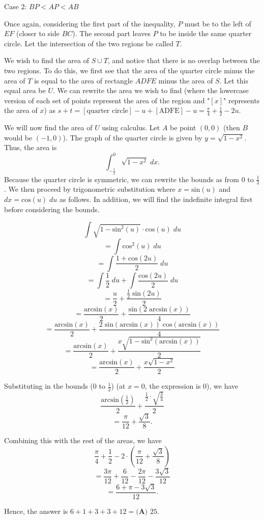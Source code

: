 \begin{enumerate}
 Case $2$: $BP<AP<AB$

 Once again, considering the first part of the inequality, $P$ must be to the left of $EF$ (closer to side $BC$). The second part leaves $P$ to be inside the same quarter circle. Let the intersection of the two regions be called $T$.

 We wish to find the area of $S \cup T$, and notice that there is no overlap between the two regions. To do this, we first see that the area of the quarter circle minus the area of $T$ is equal to the area of rectangle $ADFE$ minus the area of $S$. Let this equal area be $U$. We can rewrite the area we wish to find (where the lowercase version of each set of points represent the area of the region and "$[x]$" represents the area of $x$) as $s+t=[\text{quarter circle}]-u+[\text{ADFE}]-u=\frac{\pi}{4}+\frac{1}{2}-2u$. 

 We will now find the area of $U$ using calculus. Let $A$ be point $(0, 0)$ (then $B$ would be $(-1, 0)$). The graph of the quarter circle is given by $y=\sqrt{1-x^2}$. Thus, the area is 
 \[\int_{-\frac{1}{2}}^{0} \sqrt{1-x^2} \; dx.\]Because the quarter circle is symmetric, we can rewrite the bounds as from $0$ to $\frac{1}{2}$. We then proceed by trigonometric substitution where $x=\text{sin}(u)$ and $dx=\text{cos}(u) \; du$ as follows. In addition, we will find the indefinite integral first before considering the bounds.

 
 \[\int \sqrt{1-\text{sin}^2(u)} \cdot \text{cos}(u) \; du\]
 \[=\int \text{cos}^2(u) \; du\]
 \[=\int \frac{1+\text{cos}(2u)}{2} \; du\]
 \[=\int \frac{1}{2} \; du + \int \frac{\text{cos}(2u)}{2} \; du\]
 \[=\frac{u}{2} + \frac{\frac{1}{2} \; \text{sin}(2u)}{2}\]
 \[=\frac{\text{arcsin}(x)}{2} + \frac{\text{sin}(2 \; \text{arcsin}(x))}{4}\]
 \[=\frac{\text{arcsin}(x)}{2} + \frac{2 \; \text{sin}(\text{arcsin}(x)) \; \text{cos}(\text{arcsin}(x))}{4}\]
 \[=\frac{\text{arcsin}(x)}{2} + \frac{x \sqrt{1-\text{sin}^2(\text{arcsin}(x))}}{2}\]
 \[=\frac{\text{arcsin}(x)}{2} + \frac{x \sqrt{1-x^2}}{2}\]

 Substituting in the bounds ($0$ to $\frac{1}{2}$) (at $x=0$, the expression is $0$), we have 
 \[\frac{\text{arcsin}(\frac{1}{2})}{2} + \frac{\frac{1}{2} \cdot \sqrt{\frac{3}{4}}}{2}\]
 \[=\frac{\pi}{12} + \frac{\sqrt{3}}{8}.\]

 Combining this with the rest of the areas, we have 
 \[\frac{\pi}{4}+\frac{1}{2}-2 \cdot (\frac{\pi}{12} + \frac{\sqrt{3}}{8})\]
 \[=\frac{3 \pi}{12} + \frac{6}{12} - \frac{2 \pi}{12} - \frac{3 \sqrt{3}}{12}\]
 \[=\frac{6 + \pi - 3 \sqrt{3}}{12}.\]

 Hence, the answer is $6+1+3+3+12 = \boxed{\textbf{(A) } 25}$.

 


\end{enumerate}